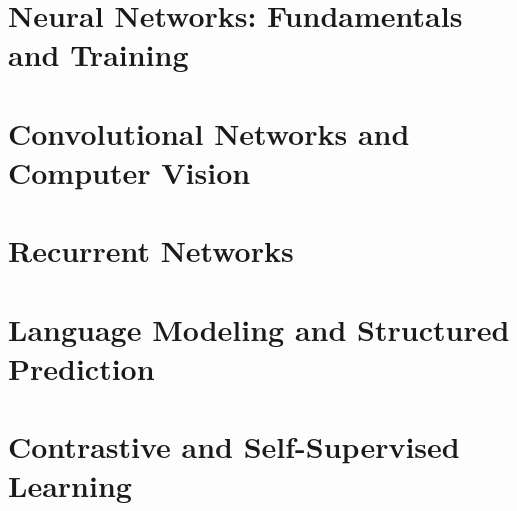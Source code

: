 \part{Neural Networks: Fundamentals and Training}








\part{Convolutional Networks and Computer Vision}







\part{Recurrent Networks}\label{part:recurrent}





\part{Language Modeling and Structured Prediction}\label{part:language}








\part{Contrastive and Self-Supervised Learning}\label{part:contrastive}



